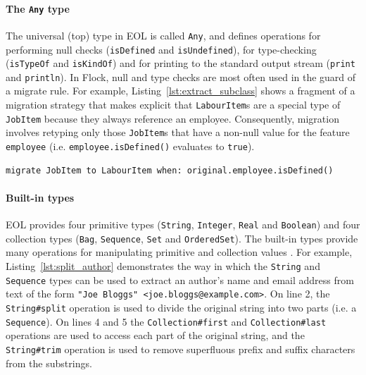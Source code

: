 \paragraph{The \texttt{Any} type} The universal (top) type in EOL is called \texttt{Any}, and defines operations for performing null checks (\texttt{isDe\-fi\-n\-ed} and \texttt{isUn\-de\-fi\-n\-ed}), for type-checking (\texttt{isTy\-peOf} and \texttt{isKi\-ndOf}) and for printing to the standard output stream (\texttt{pr\-i\-nt} and \texttt{pr\-in\-t\-ln}). In Flock, null and type checks are most often used in the guard of a migrate rule. For example, Listing~\ref{lst:extract_subclass} shows a fragment of a migration strategy that makes explicit that \texttt{La\-bo\-urIt\-em}s are a special type of \texttt{JobIt\-em} because they always reference an employee. Consequently, migration involves retyping only those \texttt{JobIt\-em}s that have a non-null value for the feature \texttt{em\-pl\-oy\-ee} (i.e. \texttt{em\-pl\-oy\-ee.isDe\-fi\-n\-ed()} evaluates to \texttt{tr\-ue}).

\begin{lstlisting}[caption=Using a non-null check to guard a migration rule,  label=lst:extract_subclass, language=Flock, float=b]
migrate JobItem to LabourItem when: original.employee.isDefined()
\end{lstlisting}

\paragraph{Built-in types} EOL provides four primitive types (\texttt{St\-ri\-ng}, \texttt{In\-te\-g\-er}, \texttt{Re\-al} and \texttt{Bo\-ol\-e\-an}) and four collection types (\texttt{Bag}, \texttt{Se\-qu\-en\-ce}, \texttt{Set} and \texttt{Or\-de\-re\-dSet}). The built-in types provide many operations for manipulating primitive and collection values \cite{kolovos06eol}. For example, Listing~\ref{lst:split_author} demonstrates the way in which the \texttt{St\-ri\-ng} and \texttt{Se\-qu\-en\-ce} types can be used to extract an author's name and email address from text of the form \texttt{"Joe Bloggs" <joe.bloggs@example.com>}. On line 2, the \texttt{St\-ri\-ng\#sp\-l\-it} operation is used to divide the original string into two parts (i.e. a \texttt{Se\-qu\-en\-ce}). On lines 4 and 5 the \texttt{Co\-ll\-ec\-ti\-on\#fi\-r\-st} and \texttt{Co\-ll\-ec\-ti\-on\#la\-st} operations are used to access each part of the original string, and the \texttt{St\-ri\-ng\#tr\-im} operation is used to remove superfluous prefix and suffix characters from the substrings.

